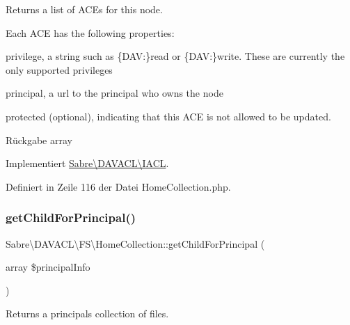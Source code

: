 Returns a list of A\+CE\textquotesingle{}s for this node.

Each A\+CE has the following properties\+:
\begin{DoxyItemize}
\item \textquotesingle{}privilege\textquotesingle{}, a string such as \{D\+AV\+:\}read or \{D\+AV\+:\}write. These are currently the only supported privileges
\item \textquotesingle{}principal\textquotesingle{}, a url to the principal who owns the node
\item \textquotesingle{}protected\textquotesingle{} (optional), indicating that this A\+CE is not allowed to be updated.
\end{DoxyItemize}

\begin{DoxyReturn}{Rückgabe}
array 
\end{DoxyReturn}


Implementiert \mbox{\hyperlink{interface_sabre_1_1_d_a_v_a_c_l_1_1_i_a_c_l_a8fe3b3a5b48eae789d7eb722b340045c}{Sabre\textbackslash{}\+D\+A\+V\+A\+C\+L\textbackslash{}\+I\+A\+CL}}.



Definiert in Zeile 116 der Datei Home\+Collection.\+php.

\mbox{\label{class_sabre_1_1_d_a_v_a_c_l_1_1_f_s_1_1_home_collection_ac336410af0388b8642713396d6a98eb5}} 
\subsubsection{\texorpdfstring{get\+Child\+For\+Principal()}{getChildForPrincipal()}}
{\footnotesize\ttfamily Sabre\textbackslash{}\+D\+A\+V\+A\+C\+L\textbackslash{}\+F\+S\textbackslash{}\+Home\+Collection\+::get\+Child\+For\+Principal (\begin{DoxyParamCaption}\item[{array}]{\$principal\+Info }\end{DoxyParamCaption})}

Returns a principals\textquotesingle{} collection of files.

